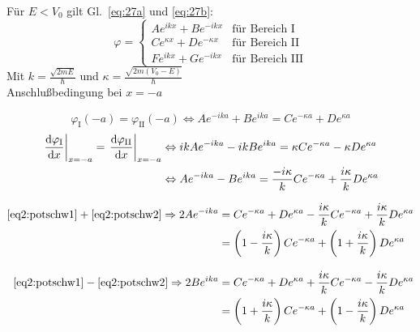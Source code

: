 Für $E<V_0$ gilt Gl.~\eqref{eq:27a} und \eqref{eq:27b}:
\begin{equation*}
  \varphi =
  \begin{cases}
    Ae^{ikx}+Be^{-ikx} & \mbox{für Bereich I}\\
    Ce^{\kappa x}+De^{-\kappa x} & \mbox{für Bereich II}\\
    Fe^{ikx}+Ge^{-ikx} & \mbox{für Bereich III}
  \end{cases}
\end{equation*}
Mit \(  k = \frac {\sqrt{2 m E}}\hbar  \) und
\( \kappa=\frac{\sqrt{2 m (V_0 - E)}}\hbar \)\\

Anschlußbedingung bei $x=-a$

\begin{equation}
  \varphi_\textrm{I} (-a) = \varphi_\textrm{II}(-a)
   \Leftrightarrow  
  Ae^{-ika}+Be^{ika} = Ce^{-\kappa a}+De^{\kappa a} 
  \label{eq2:potschw1}
\end{equation}
\begin{align}
  \left.\frac{\text{d}\varphi_\textrm{I}}{\text{d}x} \right|_{x=-a} 
      = \left.\frac{\text{d}\varphi_\textrm{II}}{\text{d}x}\right|_{x=-a}
  & \Leftrightarrow  
  ik Ae^{-ika}-ik Be^{ika} = \kappa Ce^{-\kappa a}- \kappa D e^{\kappa a}
  \label{eq2:potschw2}\\
  & \Leftrightarrow  
   Ae^{-ika}-Be^{ika} = \frac{-i\kappa}{k} Ce^{-\kappa a}
                      +\frac{i\kappa}{k} De^{\kappa a}\notag
\end{align}

\begin{align}
  \eqref{eq2:potschw1}+\eqref{eq2:potschw2}
  \Rightarrow 
  2Ae^{-ika} &= Ce^{-\kappa a}+De^{\kappa a} 
              -\frac{i\kappa}{k} Ce^{-\kappa a}
                +\frac{i\kappa}{k}De^{\kappa a} \label{eq2:potschw3} \\
             &=  \left(1-\frac{i\kappa}{k}\right)Ce^{-\kappa a}
                +\left(1+\frac{i\kappa}{k}\right)De^{\kappa a} \notag\\[2ex]
 \eqref{eq2:potschw1}-\eqref{eq2:potschw2}
  \Rightarrow 
  2Be^{ika} &= Ce^{-\kappa a}+De^{\kappa a} 
              +\frac{i\kappa}{k}Ce^{-\kappa a}
                -\frac{i\kappa}{k}De^{\kappa a} \label{eq2:potschw4} \\
             &=  \left(1+\frac{i\kappa}{k}\right)Ce^{-\kappa a}
                +\left(1-\frac{i\kappa}{k}\right)De^{\kappa a}\notag
\end{align}

